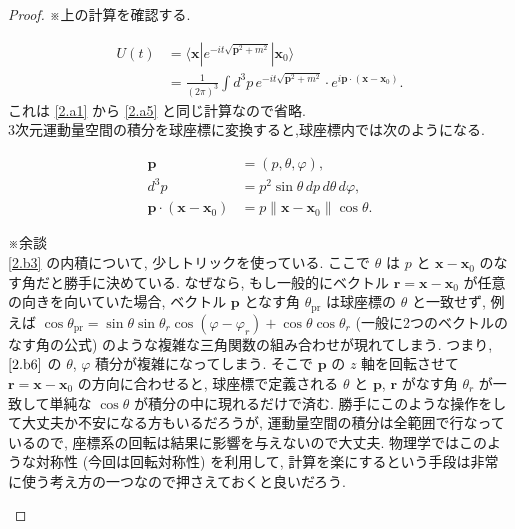 \documentclass[a4paper,12pt]{article}
\begin{document}
\color{blue}
\begin{proof} ※上の計算を確認する.

\begin{align*}
  U(t) &= \langle \boldsymbol{x} | e^{-it\sqrt{\boldsymbol{p}^2 + m^2}} | \boldsymbol{x}_0 \rangle \tag{2-1.b1} \\
      &= \frac{1}{(2\pi)^3} \int d^3p \, e^{-it\sqrt{\boldsymbol{p}^2 + m^2}} \cdot e^{i\boldsymbol{p} \cdot (\boldsymbol{x} - \boldsymbol{x}_0)}. \tag{2-1.b2}
\end{align*}
これは \eqref{2.a1} から \eqref{2.a5} と同じ計算なので省略. \\
3次元運動量空間の積分を球座標に変換すると,球座標内では次のようになる.

\begin{align*}
  \boldsymbol{p} &= (p, \theta, \varphi), \tag{2-1.b3}\\
  d^3p &= p^2 \sin \theta \, dp \, d\theta \, d\varphi, \tag{2-1.b4}\\
  \boldsymbol{p} \cdot (\boldsymbol{x} - \boldsymbol{x}_0) &= p \| \boldsymbol{x} - \boldsymbol{x}_0 \| \cos \theta. \label{2.b3}\tag{2-1.b5}
\end{align*}

\begin{framed}
※余談\\
\eqref{2.b3} の内積について, 少しトリックを使っている. ここで $\theta$ は $p$ と $\boldsymbol{x} - \boldsymbol{x}_0$ のなす角だと勝手に決めている. なぜなら, もし一般的にベクトル $\boldsymbol{r} = \boldsymbol{x} - \boldsymbol{x}_0$ が任意の向きを向いていた場合, ベクトル $\boldsymbol{p}$ となす角 $\theta_{\textrm{pr}}$ は球座標の $\theta$ と一致せず, 例えば $\cos\theta_{\textrm{pr}} = \sin\theta \sin\theta_r \cos(\varphi - \varphi_r) + \cos\theta\cos\theta_r$ (一般に2つのベクトルのなす角の公式) のような複雑な三角関数の組み合わせが現れてしまう. つまり, $\eqref{2.b6}$ の $\theta$, $\varphi$ 積分が複雑になってしまう. そこで $\boldsymbol{p}$ の $z$ 軸を回転させて $\boldsymbol{r} = \boldsymbol{x} - \boldsymbol{x}_0$ の方向に合わせると, 球座標で定義される $\theta$ と $\boldsymbol{p}$, $\boldsymbol{r}$ がなす角 $\theta_r$ が一致して単純な $\cos\theta$ が積分の中に現れるだけで済む. 勝手にこのような操作をして大丈夫か不安になる方もいるだろうが, 運動量空間の積分は全範囲で行なっているので, 座標系の回転は結果に影響を与えないので大丈夫. 物理学ではこのような対称性 (今回は回転対称性) を利用して, 計算を楽にするという手段は非常に使う考え方の一つなので押さえておくと良いだろう. 
\end{framed}


\end{proof}
\end{document}
